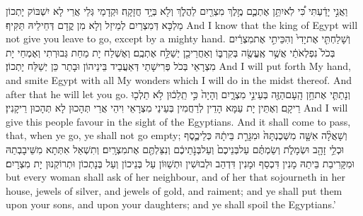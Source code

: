 {וַאֲנִ֣י יָדַ֔עְתִּי כִּ֠י לֹֽא\maqqaf יִתֵּ֥ן אֶתְכֶ֛ם מֶ֥לֶךְ מִצְרַ֖יִם לַהֲלֹ֑ךְ וְלֹ֖א בְּיָ֥ד חֲזָקָֽה׃}
{וּקְדָמַי גְּלֵי אֲרֵי לָא יִשְׁבּוֹק יָתְכוֹן מַלְכָּא דְּמִצְרַיִם לְמֵיזַל וְלָא מִן קֳדָם דְּחֵילֵיהּ תַּקִּיף׃}
{And I know that the king of Egypt will not give you leave to go, except by a mighty hand.}{}
{וְשָׁלַחְתִּ֤י אֶת\maqqaf יָדִי֙ וְהִכֵּיתִ֣י אֶת\maqqaf מִצְרַ֔יִם בְּכֹל֙ נִפְלְאֹתַ֔י אֲשֶׁ֥ר אֶֽעֱשֶׂ֖ה בְּקִרְבּ֑וֹ וְאַחֲרֵי\maqqaf כֵ֖ן יְשַׁלַּ֥ח אֶתְכֶֽם׃}
{וְאֶשְׁלַח יָת מַחַת גְּבוּרְתִי וְאֶמְחֵי יָת מִצְרָאֵי בְּכֹל פְּרִישָׁתַי דְּאַעֲבֵיד בֵּינֵיהוֹן וּבָתַר כֵּן יְשַׁלַּח יָתְכוֹן׃}
{And I will put forth My hand, and smite Egypt with all My wonders which I will do in the midst thereof. And after that he will let you go.}{}
{וְנָתַתִּ֛י אֶת\maqqaf חֵ֥ן הָֽעָם\maqqaf הַזֶּ֖ה בְּעֵינֵ֣י מִצְרָ֑יִם וְהָיָה֙ כִּ֣י תֵֽלֵכ֔וּן לֹ֥א תֵלְכ֖וּ רֵיקָֽם׃}
{וְאֶתֵּין יָת עַמָּא הָדֵין לְרַחֲמִין בְּעֵינֵי מִצְרָאֵי וִיהֵי אֲרֵי תְּהָכוּן לָא תְּהָכוּן רֵיקָנִין׃}
{And I will give this people favour in the sight of the Egyptians. And it shall come to pass, that, when ye go, ye shall not go empty;}{}
{וְשָׁאֲלָ֨ה אִשָּׁ֤ה מִשְּׁכֶנְתָּהּ֙ וּמִגָּרַ֣ת בֵּיתָ֔הּ כְּלֵי\maqqaf כֶ֛סֶף וּכְלֵ֥י זָהָ֖ב וּשְׂמָלֹ֑ת וְשַׂמְתֶּ֗ם עַל\maqqaf בְּנֵיכֶם֙ וְעַל\maqqaf בְּנֹ֣תֵיכֶ֔ם וְנִצַּלְתֶּ֖ם אֶת\maqqaf מִצְרָֽיִם׃}
{וְתִשְׁאַל אִתְּתָא מִשֵּׁיבָבְתַהּ וּמִקָּרִיבַת בֵּיתַהּ מָנִין דִּכְסַף וּמָנִין דִּדְהַב וּלְבוּשִׁין וּתְשַׁוּוֹן עַל בְּנֵיכוֹן וְעַל בְּנָתְכוֹן וּתְרוֹקְנוּן יָת מִצְרָיִם׃}
{but every woman shall ask of her neighbour, and of her that sojourneth in her house, jewels of silver, and jewels of gold, and raiment; and ye shall put them upon your sons, and upon your daughters; and ye shall spoil the Egyptians.’}{}
